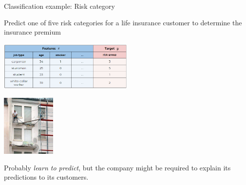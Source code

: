 \documentclass[11pt,compress,t,notes=noshow, xcolor=table]{beamer}
\begin{document}
\begin{vbframe}{Classification example: Risk category}

  Predict one of five risk categories for a life insurance customer to determine the insurance premium
\begin{center}

    \includegraphics[width=0.5\textwidth]{figure_man/ml-basics-supervised-task-insurance-data.png}

\lz

  \includegraphics[width = 0.2\textwidth]{figure_man/classif_ex_placeholder.jpg}
\end{center}

Probably \textit{learn to predict}, but the company might be required to explain
its predictions to its customers.

\end{vbframe}




%
%
%
%
%
%
%
\end{document}

